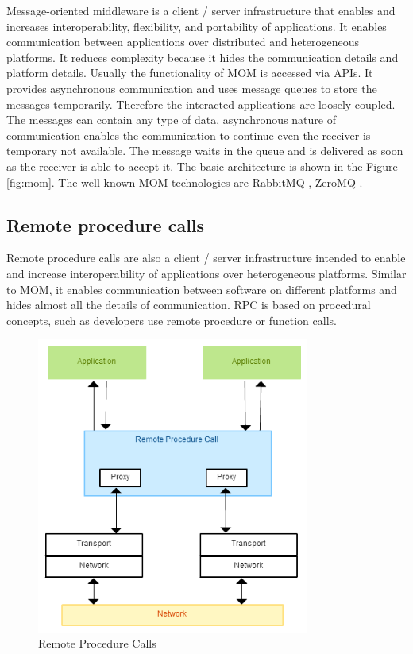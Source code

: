 Message-oriented middleware is a client / server infrastructure that enables and increases interoperability, flexibility, and portability of applications. It enables communication between applications over distributed and heterogeneous platforms. It reduces complexity because it hides the communication details and platform details. Usually the functionality of MOM is accessed via APIs. It provides asynchronous communication and uses message queues to store the messages temporarily. Therefore the interacted applications are loosely coupled. The messages can contain any type of data, asynchronous nature of communication enables the communication to continue even the receiver is temporary not available. The message waits in the queue and is delivered as soon as the receiver is able to accept it. The basic architecture is shown in the Figure \ref{fig:mom}. The well-known MOM technologies are RabbitMQ \cite{rabbitmq}, ZeroMQ \cite{zeromq}.

\subsection{Remote procedure calls}

Remote procedure calls are also a client / server infrastructure intended to enable and increase interoperability of applications over heterogeneous platforms. Similar to MOM, it enables communication between software on different platforms and hides almost all the details of communication. RPC is based on procedural concepts, such as developers use remote procedure or function calls.

\begin{figure}
    \centering
    \includegraphics[width=0.8\textwidth]{resources/RPC.png}
    \caption{Remote Procedure Calls}
    \label{fig:rpc}
\end{figure}

